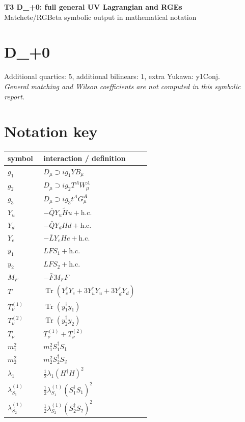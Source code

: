 \documentclass[10pt,a4paper]{article}
\begin{document}
\begin{center}
{\Large\bfseries T3 D\_+0: full general UV Lagrangian and RGEs}\\[4pt]
Matchete/RGBeta symbolic output in mathematical notation
\end{center}
\bigskip
\section*{D\_+0}
Additional quartics: 5, additional bilinears: 1, extra Yukawa: y1Conj.\\
\emph{General matching and Wilson coefficients are not computed in this symbolic report.}
\section*{Notation key}
\begin{longtable}{@{}p{0.23\linewidth}p{0.69\linewidth}@{}}
\toprule
symbol & interaction / definition \\
\midrule
$g_1$ & $D_\mu\supset i g_1YB_\mu$ \\
$g_2$ & $D_\mu\supset i g_2T^AW_\mu^A$ \\
$g_3$ & $D_\mu\supset i g_3t^AG_\mu^A$ \\
$Y_u$ & $-\bar QY_u\widetilde Hu+\mathrm{h.c.}$ \\
$Y_d$ & $-\bar QY_dHd+\mathrm{h.c.}$ \\
$Y_e$ & $-\bar LY_eHe+\mathrm{h.c.}$ \\
$y_1$ & $LFS_1+\mathrm{h.c.}$ \\
$y_2$ & $LFS_2+\mathrm{h.c.}$ \\
$M_F$ & $-\bar FM_FF$ \\
$T$ & $\operatorname{Tr}(Y_e^\dagger Y_e+3Y_u^\dagger Y_u+3Y_d^\dagger Y_d)$ \\
$T_\nu^{(1)}$ & $\operatorname{Tr}(y_1^\dagger y_1)$ \\
$T_\nu^{(2)}$ & $\operatorname{Tr}(y_2^\dagger y_2)$ \\
$T_\nu$ & $T_\nu^{(1)}+T_\nu^{(2)}$ \\
$m_1^2$ & $m_1^2S_1^\dagger S_1$ \\
$m_2^2$ & $m_2^2S_2^\dagger S_2$ \\
$\lambda_1$ & $\frac12\lambda_1(H^\dagger H)^2$ \\
$\lambda_{S_1}^{(1)}$ & $\frac12\lambda_{S_1}^{(1)}(S_1^\dagger S_1)^2$ \\
$\lambda_{S_2}^{(1)}$ & $\frac12\lambda_{S_2}^{(1)}(S_2^\dagger S_2)^2$ \\

\end{longtable}
\end{document}
